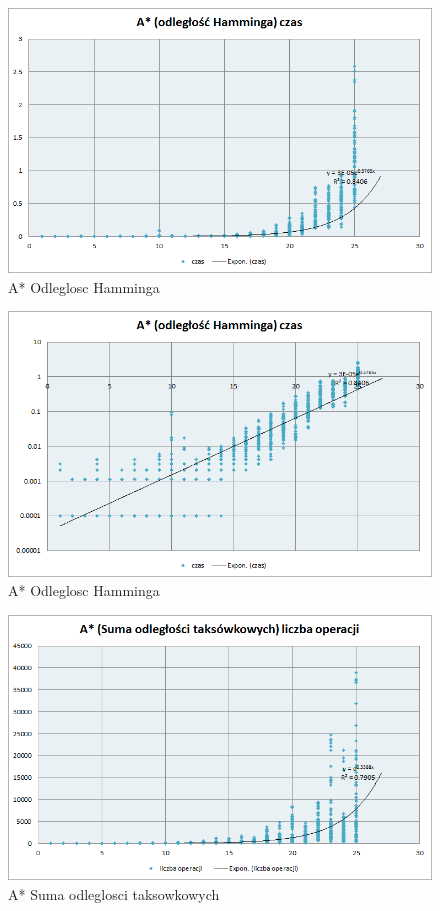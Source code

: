 \documentclass{classrep}
\begin{document}
\begin{figure}[ht]
\centering
			\includegraphics[scale=0.65]{pictures/A2_czas_exp.png}
	\caption{A* Odleglosc Hamminga}
	\label{fig:A* Odleglosc Hamminga}
\end{figure}

\begin{figure}[ht]
\centering
			\includegraphics[scale=0.65]{pictures/A2_czas_log.png}
	\caption{A* Odleglosc Hamminga}
	\label{fig:A* Odleglosc Hamminga}
\end{figure}

\begin{figure}[ht]
\centering
			\includegraphics[scale=0.65]{pictures/A3_operacje_exp.png}
	\caption{A* Suma odleglosci taksowkowych}
	\label{fig:A* Suma odleglosci taksowkowych}
\end{figure}
\end{document}
